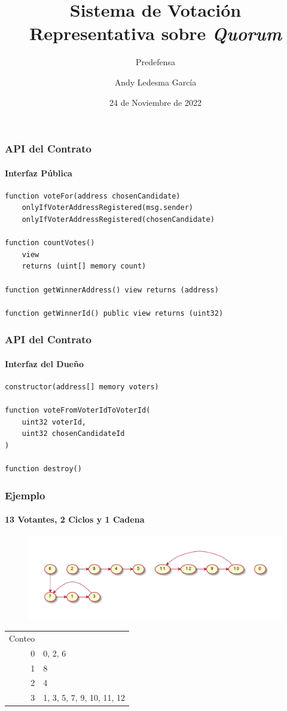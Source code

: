 \documentclass{beamer}
\title{Sistema de Votaci\'on Representativa sobre \textit{Quorum}}
\subtitle{Predefensa}
\author{Andy Ledesma Garc\'ia}
\institute{Universidad de La Habana}
\date{24 de Noviembre de 2022}
\begin{document}
\begin{frame}
    \titlepage
\end{frame}

\begin{frame}[fragile]
    \frametitle{API del Contrato}
    \framesubtitle{Interfaz P\'ublica}

    \begin{lstlisting}[language=Solidity]
function voteFor(address chosenCandidate) 
    onlyIfVoterAddressRegistered(msg.sender)
    onlyIfVoterAddressRegistered(chosenCandidate) 

function countVotes() 
    view 
    returns (uint[] memory count) 

function getWinnerAddress() view returns (address) 

function getWinnerId() public view returns (uint32)   
    \end{lstlisting}

\end{frame}

\begin{frame}[fragile]
    \frametitle{API del Contrato}
    \framesubtitle{Interfaz del Due\~no}

    \begin{lstlisting}[language=Solidity]
constructor(address[] memory voters) 

function voteFromVoterIdToVoterId(
    uint32 voterId, 
    uint32 chosenCandidateId
) 

function destroy()
    \end{lstlisting}

\end{frame}

\begin{frame}
    \frametitle{Ejemplo}
    \framesubtitle{13 Votantes, 2 Ciclos y 1 Cadena}

    \begin{figure}
        \includegraphics[scale=.5]{graphics/example.pdf}
        \centering
    \end{figure}

    \begin{center}
        \begin{tabular}{r|l}
            Conteo & \\
            0 & 0, 2, 6  \\  
            1 & 8        \\   
            2 & 4        \\   
            3 & 1, 3, 5, 7, 9, 10, 11, 12  
        \end{tabular}
    \end{center}
\end{frame}
\end{document}
